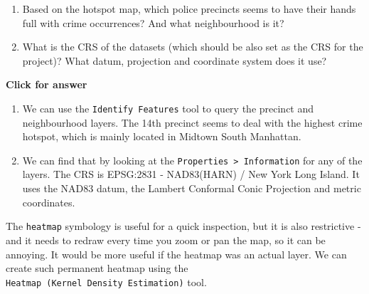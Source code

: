 \documentclass[
  letterpaper,
  DIV=11,
  numbers=noendperiod]{scrreprt}
\begin{document}
\begin{tcolorbox}[enhanced jigsaw, coltitle=black, toprule=.15mm, breakable, opacitybacktitle=0.6, left=2mm, colback=white, leftrule=.75mm, rightrule=.15mm, colbacktitle=quarto-callout-important-color!10!white, toptitle=1mm, titlerule=0mm, colframe=quarto-callout-important-color-frame, arc=.35mm, bottomtitle=1mm, opacityback=0, bottomrule=.15mm, title=\textcolor{quarto-callout-important-color}{\faExclamation}\hspace{0.5em}{Stop and Think}]

\begin{enumerate}
\def\labelenumi{\Alph{enumi})}
\item
  Based on the hotspot map, which police precincts seems to have their
  hands full with crime occurrences? And what neighbourhood is it?
\item
  What is the CRS of the datasets (which should be also set as the CRS
  for the project)? What datum, projection and coordinate system does it
  use?
\end{enumerate}

\end{tcolorbox}

\begin{tcolorbox}[enhanced jigsaw, toprule=.15mm, breakable, left=2mm, colframe=quarto-callout-important-color-frame, colback=white, arc=.35mm, leftrule=.75mm, opacityback=0, rightrule=.15mm, bottomrule=.15mm]

\vspace{-3mm}\textbf{Click for answer}\vspace{3mm}

\begin{enumerate}
\def\labelenumi{\Alph{enumi})}
\item
  We can use the \texttt{Identify\ Features} tool to query the precinct
  and neighbourhood layers. The 14th precinct seems to deal with the
  highest crime hotspot, which is mainly located in Midtown South
  Manhattan.
\item
  We can find that by looking at the
  \texttt{Properties\ \textgreater{}\ Information} for any of the
  layers. The CRS is EPSG:2831 - NAD83(HARN) / New York Long Island. It
  uses the NAD83 datum, the Lambert Conformal Conic Projection and
  metric coordinates.
\end{enumerate}

\end{tcolorbox}

The \texttt{heatmap} symbology is useful for a quick inspection, but it
is also restrictive - and it needs to redraw every time you zoom or pan
the map, so it can be annoying. It would be more useful if the heatmap
was an actual layer. We can create such permanent heatmap using the
\texttt{Heatmap\ (Kernel\ Density\ Estimation)} tool.
\end{document}
